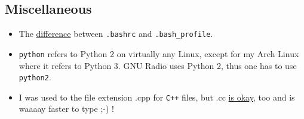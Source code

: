 \documentclass{article}
\begin{document}
\subsection{Miscellaneous}

\begin{itemize}
	\item The \href{http://www.joshstaiger.org/archives/2005/07/bash_profile_vs.html }{difference} between \verb|.bashrc| and \verb|.bash_profile|.
	
	\item \verb|python| refers to Python 2 on virtually any Linux, except for my Arch Linux where it refers to Python 3. GNU Radio uses Python 2, thus one has to use \verb|python2|. 
	
	\item I was used to the file extension .cpp for \texttt{C++} files, but .cc \href{http://stackoverflow.com/questions/1545080/c-code-file-extension-cc-vs-cpp}{is okay}, too and is waaaay faster to type ;-) !
\end{itemize}
\end{document}
